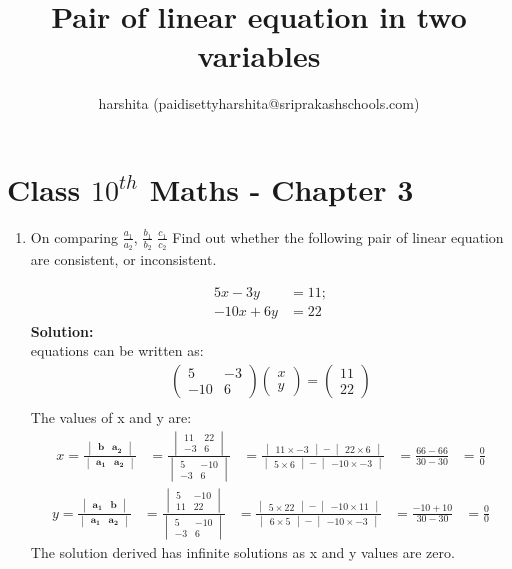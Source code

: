 \documentclass[12pt]{article}
\title{Pair of linear equation in two variables}
\author{harshita (paidisettyharshita@sriprakashschools.com)}
\newcommand{\myvec}[1]{\ensuremath{\begin{pmatrix}#1\end{pmatrix}}}
\newcommand{\mydet}[1]{\ensuremath{\begin{vmatrix}#1\end{vmatrix}}}
\newcommand{\solution}{\noindent \textbf{Solution: }}
\let\vec\mathbf
\begin{document}
\maketitle
\section*{Class $10^{th}$ Maths - Chapter 3}

\begin{enumerate}
 \item On comparing $\frac{a_1}{a_2}$, $\frac{b_1}{b_2}$ $\frac{c_1}{c_2} $
Find out whether the following pair of linear equation are consistent, or inconsistent.

\begin{align}
5x-3y&=11;\\
-10x+6y&=22
\end{align}
 \solution \\
 equations can be written as:\\

\begin{align}
\myvec{5&-3\\-10&6} \myvec{x\\y} = \myvec{11\\22}\\
\end{align}
The values of x and y are:
\begin{align}
x=\frac{\mydet{\vec{b} & \vec{a_2}}}{\mydet {\vec{a_1} &\vec{a_2}}} &=
\frac{\mydet{11&22 \\ -3&6}}{\mydet {5&-10 \\ -3&6}}&=\frac{\mydet{11\times-3}-\mydet{22\times6}}{\mydet{5\times6}-\mydet{-10\times-3}}
&=\frac{66-66}{30-30}&=\frac{0}{0}
\end{align}
\begin{align}
 y=\frac{\mydet{\vec{a_1} &\vec{b}}}{\mydet {\vec{a_1} &\vec{a_2}}}&=
\frac{\mydet{5&-10\\11&22}}{\mydet{5&-10\\-3&6}}&=\frac{\mydet{5\times22}-\mydet{-10\times11}}{\mydet{6\times5}-\mydet{-10\times-3}}
&=\frac{-10+10}{30-30}&=\frac{0}{0}
\end{align}
The solution derived has infinite solutions as x and y values are zero.

\end{enumerate}
\end{document}
